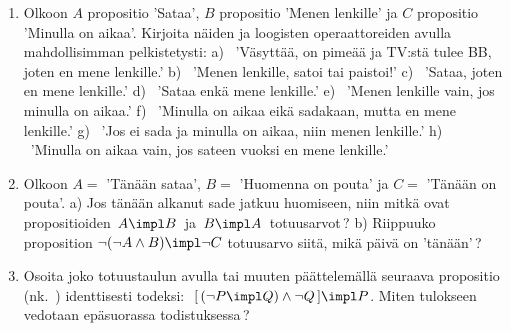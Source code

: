 \Harj
\begin{enumerate}

\item
Olkoon $A$ propositio 'Sataa', $B$ propositio 'Menen lenkille' ja $C$ propositio 'Minulla on
aikaa'. Kirjoita näiden ja loogisten operaattoreiden avulla mahdollisimman pelkistetysti: \newline
a) \ 'Väsyttää, on pimeää ja TV:stä tulee BB, joten en mene lenkille.' \newline
b) \ 'Menen lenkille, satoi tai paistoi!' \newline
c) \ 'Sataa, joten en mene lenkille.' \newline
d) \ 'Sataa enkä mene lenkille.' \newline
e) \ 'Menen lenkille vain, jos minulla on aikaa.' \newline
f) \ 'Minulla on aikaa eikä sadakaan, mutta en mene lenkille.' \newline
g) \ 'Jos ei sada ja minulla on aikaa, niin menen lenkille.' \newline
h) \ 'Minulla on aikaa vain, jos sateen vuoksi en mene lenkille.'

\item Olkoon $A=$ 'Tänään sataa', $B=$ 'Huomenna on pouta' ja $C=$ 'Tänään on pouta'. a) Jos 
tänään alkanut sade jatkuu huomiseen, niin mitkä ovat propositioiden $\,A \impl B\,$ ja 
$\,B \impl A\,$ totuusarvot\,? b) Riippuuko proposition
$\neg(\neg A \wedge B) \impl \neg C$ totuusarvo siitä, mikä päivä on 'tänään'\,?

\item \label{H-I-3: modus tollens} 
Osoita joko totuustaulun avulla tai muuten päättelemällä seuraava propositio 
(nk.\ ) identtisesti todeksi:
$\ [\,(\neg P \impl Q) \wedge \neg Q\,] \impl P$. \newline
Miten tulokseen vedotaan epäsuorassa todistuksessa\,?


\end{enumerate}
